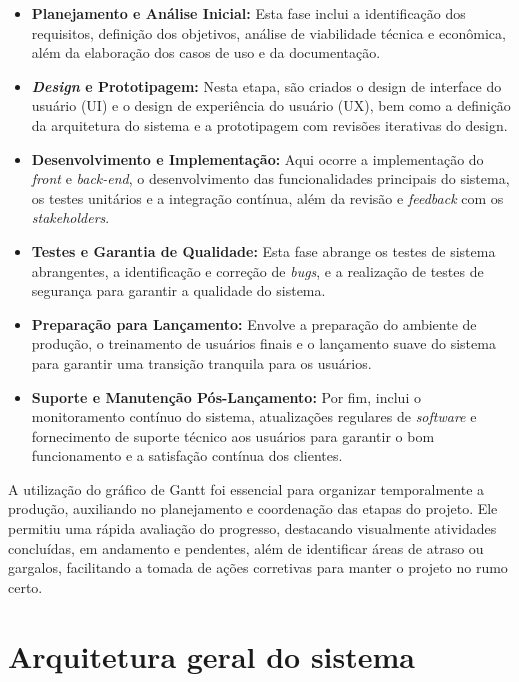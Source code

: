 \begin{itemize}
    \item \textbf{Planejamento e Análise Inicial:} Esta fase inclui a identificação dos requisitos, definição dos objetivos, análise de viabilidade técnica e econômica, além da elaboração dos casos de uso e da documentação.
    
    \item \textbf{\textit{Design} e Prototipagem:} Nesta etapa, são criados o design de interface do usuário (UI) e o design de experiência do usuário (UX), bem como a definição da arquitetura do sistema e a prototipagem com revisões iterativas do design.
    
    \item \textbf{Desenvolvimento e Implementação:} Aqui ocorre a implementação do \textit{front} e \textit{back-end}, o desenvolvimento das funcionalidades principais do sistema, os testes unitários e a integração contínua, além da revisão e \textit{feedback} com os \textit{stakeholders}.
    
    \item \textbf{Testes e Garantia de Qualidade:} Esta fase abrange os testes de sistema abrangentes, a identificação e correção de \textit{bugs}, e a realização de testes de segurança para garantir a qualidade do sistema.
    
    \item \textbf{Preparação para Lançamento:} Envolve a preparação do ambiente de produção, o treinamento de usuários finais e o lançamento suave do sistema para garantir uma transição tranquila para os usuários.
    
    \item \textbf{Suporte e Manutenção Pós-Lançamento:} Por fim, inclui o monitoramento contínuo do sistema, atualizações regulares de \textit{software} e fornecimento de suporte técnico aos usuários para garantir o bom funcionamento e a satisfação contínua dos clientes.
\end{itemize}

A utilização do gráfico de Gantt foi essencial para organizar temporalmente a produção, auxiliando no planejamento e coordenação das etapas do projeto. Ele permitiu uma rápida avaliação do progresso, destacando visualmente atividades concluídas, em andamento e pendentes, além de identificar áreas de atraso ou gargalos, facilitando a tomada de ações corretivas para manter o projeto no rumo certo.
        
\section{Arquitetura geral do sistema}

